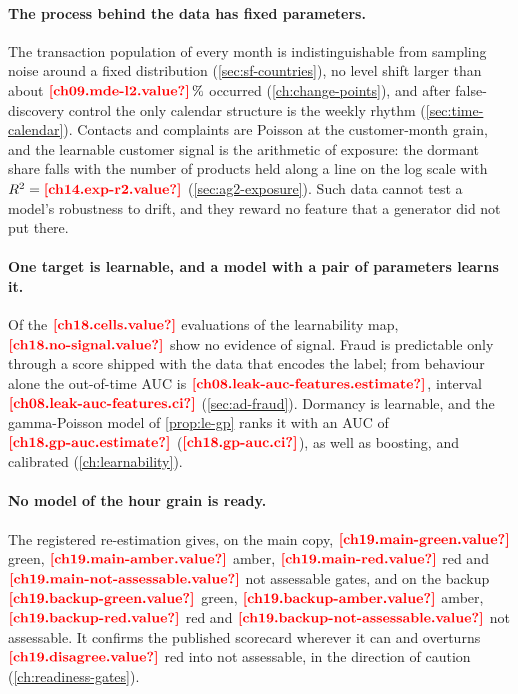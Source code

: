 \paragraph{The process behind the data has fixed parameters.} The transaction population of every month is
indistinguishable from sampling noise around a fixed distribution (\cref{sec:sf-countries}), no level shift larger
than about $\est{ch09.mde-l2}{value}\,\%$ occurred (\cref{ch:change-points}), and after false-discovery control the
only calendar structure is the weekly rhythm (\cref{sec:time-calendar}). Contacts and complaints are Poisson at the
customer-month grain, and the learnable customer signal is the arithmetic of exposure: the dormant share falls with the
number of products held along a line on the log scale with $R^2 = \est{ch14.exp-r2}{value}$ (\cref{sec:ag2-exposure}).
Such data cannot test a model's robustness to drift, and they reward no feature that a generator did not put there.

\paragraph{One target is learnable, and a model with a pair of parameters learns it.} Of the
$\est{ch18.cells}{value}$ evaluations of the learnability map, $\est{ch18.no-signal}{value}$ show no evidence of signal.
Fraud is predictable only through a score shipped with the data that encodes the label; from behaviour alone the
out-of-time AUC is $\est{ch08.leak-auc-features}{estimate}$, interval $\est{ch08.leak-auc-features}{ci}$
(\cref{sec:ad-fraud}). Dormancy is learnable, and the gamma-Poisson model of \cref{prop:le-gp} ranks it with an AUC of
$\est{ch18.gp-auc}{estimate}$ ($\est{ch18.gp-auc}{ci}$), as well as boosting, and calibrated (\cref{ch:learnability}).

\paragraph{No model of the hour grain is ready.} The registered re-estimation gives, on the main copy,
$\est{ch19.main-green}{value}$ green, $\est{ch19.main-amber}{value}$ amber, $\est{ch19.main-red}{value}$ red and
$\est{ch19.main-not-assessable}{value}$ not assessable gates, and on the backup $\est{ch19.backup-green}{value}$ green,
$\est{ch19.backup-amber}{value}$ amber, $\est{ch19.backup-red}{value}$ red and $\est{ch19.backup-not-assessable}{value}$
not assessable. It confirms the published scorecard wherever it can and overturns $\est{ch19.disagree}{value}$ red into
not assessable, in the direction of caution (\cref{ch:readiness-gates}).

